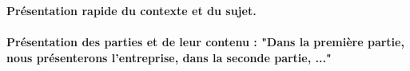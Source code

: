 \textbf{Présentation rapide du contexte et du sujet.}\\
\lipsum[1]\\
\textbf{Présentation des parties et de leur contenu : "Dans la première partie, nous présenterons l'entreprise, dans la seconde partie, ..."}\\
\lipsum[2]\\
